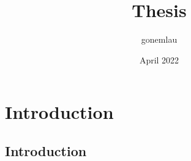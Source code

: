 \documentclass{book}
\title{Thesis}
\author{gonemlau }
\date{April 2022}
\begin{document}
\maketitle
\chapter{Introduction}
\section{Introduction}
\end{document}
